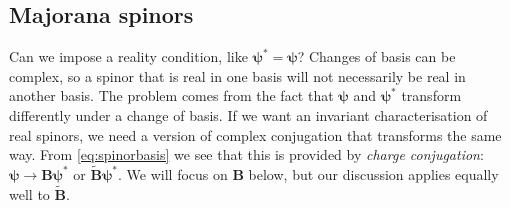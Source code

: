 \documentclass[11pt]{article}
\newcommand{\B}{\mathbf{B}}
\newcommand{\Bt}{\widetilde{\mathbf{B}}}
\newcommand{\psib}{\boldsymbol{\psi}}
\begin{document}

\subsection{Majorana spinors}\label{sec:majorana}

Can we impose a reality condition, like $\psib^\ast = \psib$?
Changes of basis can be complex, so a spinor that is real in one basis will not necessarily be real in another basis.
The problem comes from the fact that $\psib$ and $\psib^\ast$ transform differently under a change of basis.
If we want an invariant characterisation of real spinors, we need a version of complex conjugation that transforms the same way.
From \cref{eq:spinorbasis} we see that this is provided by \emph{charge conjugation}: \( \psib \to \B \psib^\ast \) or \( \Bt \psib^\ast \).
We will focus on $\B$ below, but our discussion applies equally well to $\Bt$.
\end{document}
